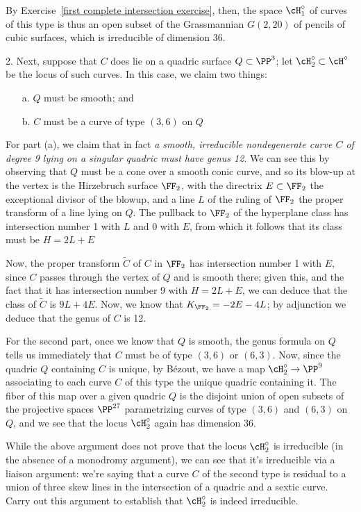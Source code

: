 By Exercise~\ref{first complete intersection exercise}, then, the space $\cH^\circ_1$ of curves of this type is thus an open subset of the Grassmannian $G(2,20)$ of pencils of cubic surfaces, which is irreducible of dimension 36.

2. Next, suppose that $C$ does lie on a quadric surface $Q \subset \PP^3$; let $\cH^\circ_2 \subset \cH^\circ$ be the locus of such curves. In this case, we claim two things:
\begin{enumerate}
\item[a.] $Q$ must be smooth; and
\item[b.] $C$ must be a curve of type $(3,6)$ on $Q$
\end{enumerate}

For part (a), we claim that in fact \emph{a smooth, irreducible nondegenerate curve $C$ of degree 9 lying on a singular quadric must have genus 12}. We can see this by observing that $Q$ must be a cone over a smooth conic curve, and so its blow-up at the vertex is the Hirzebruch surface $\FF_2$, with the directrix $E \subset \FF_2$ the exceptional divisor of the blowup, and a line $L$ of the ruling of $\FF_2$ the proper transform of a line lying on $Q$. The pullback to $\FF_2$ of the hyperplane class has intersection number 1 with $L$ and 0 with $E$, from which it follows that its class must  be $H = 2L + E$

Now, the proper transform $\tilde C$ of $C$ in $\FF_2$ has intersection number 1 with $E$, since $C$ passes through the vertex of $Q$ and is smooth there; given this, and the fact that it has intersection number 9 with $H = 2L+E$, we can deduce that the class of $\tilde C$ is $9L + 4E$. Now, we know that $K_{\FF_2} = -2E - 4L$; by adjunction we deduce that  the genus of $C$ is 12.

For the second part, once we know that $Q$ is smooth, the genus formula on $Q$ tells us immediately that $C$ must be of type $(3,6)$ or $(6,3)$. Now, since the quadric $Q$ containing $C$ is unique, by B\'ezout, we have a map $\cH^\circ_2 \to \PP^9$ associating to each curve $C$ of this type the unique quadric containing it. The fiber of this map over a given quadric $Q$ is the disjoint union of open subsets of the projective spaces $\PP^{27}$ parametrizing curves of type $(3,6)$ and $(6,3)$ on $Q$, and we see that the locus $\cH^\circ_2$ again has dimension 36.

\begin{exercise}
While the above argument does not prove that the locus $\cH^\circ_2$ is irreducible (in the absence of a monodromy argument), we can see that it's irreducible via a liaison argument: we're saying that a curve $C$ of the second type is residual to a union of three skew lines in the intersection of a quadric and a sextic curve. Carry out this argument to establish that $\cH^\circ_2$ is indeed irreducible.
\end{exercise}



